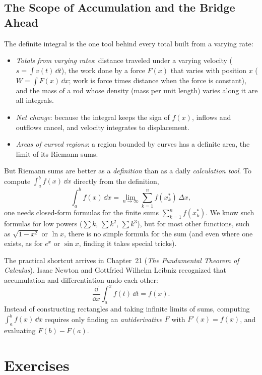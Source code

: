 \subsection{The Scope of Accumulation and the Bridge Ahead}
\label{ch20:what-unlocked}

\begin{connectionbox}
The definite integral is the one tool behind every total built from a varying rate:
\begin{itemize}
  \item \emph{Totals from varying rates}: distance traveled under a varying velocity ($s = \int v(t)\,\dd t$), the work done by a force $F(x)$ that varies with position $x$ ($W = \int F(x)\,\dd x$; work is force times distance when the force is constant), and the mass of a rod whose density (mass per unit length) varies along it are all integrals.
  \item \emph{Net change}: because the integral keeps the sign of $f(x)$, inflows and outflows cancel, and velocity integrates to displacement.
  \item \emph{Areas of curved regions}: a region bounded by curves has a definite area, the limit of its Riemann sums.
\end{itemize}

But Riemann sums are better as a \emph{definition} than as a daily \emph{calculation tool}. To compute $\int_a^b f(x)\,\dd x$ directly from the definition,
\[
  \int_a^b f(x)\,\dd x = \lim_{n\to\infty} \sum_{k=1}^n f(x_k^\ast)\,\Delta x,
\]
one needs closed-form formulas for the finite sums $\sum_{k=1}^n f(x_k^\ast)$. We know such formulas for low powers ($\sum k$, $\sum k^2$, $\sum k^3$), but for most other functions, such as $\sqrt{1-x^2}$ or $\ln x$, there is no simple formula for the sum (and even where one exists, as for $e^x$ or $\sin x$, finding it takes special tricks).

The practical shortcut arrives in Chapter~21 (\emph{The Fundamental Theorem of Calculus}). Isaac Newton and Gottfried Wilhelm Leibniz recognized that accumulation and differentiation undo each other:
\[
  \frac{\dd}{\dd x} \int_a^x f(t)\,\dd t = f(x).
\]
Instead of constructing rectangles and taking infinite limits of sums, computing $\int_a^b f(x)\,\dd x$ requires only finding an \emph{antiderivative} $F$ with $F'(x) = f(x)$, and evaluating $F(b) - F(a)$.
\end{connectionbox}

\section{Exercises}
\label{ch20:exercises}

